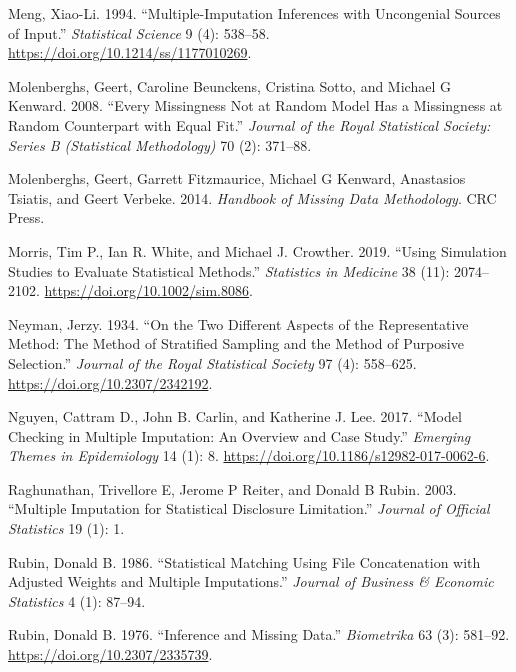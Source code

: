 \documentclass[
]{article}
\newlength{\cslhangindent}
\newlength{\cslentryspacingunit} %
\newenvironment{CSLReferences}[2] %
 {%
  \setlength{\parindent}{0pt}
  \ifodd #1
  \let\oldpar\par
  \def\par{\hangindent=\cslhangindent\oldpar}
  \fi
  \setlength{\parskip}{#2\cslentryspacingunit}
 }%
 {}
\begin{document}
\begin{CSLReferences}{1}{0}
\leavevmode{}%
Meng, Xiao-Li. 1994. {``Multiple-{Imputation Inferences} with
{Uncongenial Sources} of {Input}.''} \emph{Statistical Science} 9 (4):
538--58. \url{https://doi.org/10.1214/ss/1177010269}.

\leavevmode{}%
Molenberghs, Geert, Caroline Beunckens, Cristina Sotto, and Michael G
Kenward. 2008. {``Every Missingness Not at Random Model Has a
Missingness at Random Counterpart with Equal Fit.''} \emph{Journal of
the Royal Statistical Society: Series B (Statistical Methodology)} 70
(2): 371--88.

\leavevmode{}%
Molenberghs, Geert, Garrett Fitzmaurice, Michael G Kenward, Anastasios
Tsiatis, and Geert Verbeke. 2014. \emph{Handbook of Missing Data
Methodology}. {CRC Press}.

\leavevmode{}%
Morris, Tim P., Ian R. White, and Michael J. Crowther. 2019. {``Using
Simulation Studies to Evaluate Statistical Methods.''} \emph{Statistics
in Medicine} 38 (11): 2074--2102.
\url{https://doi.org/10.1002/sim.8086}.

\leavevmode{}%
Neyman, Jerzy. 1934. {``On the {Two Different Aspects} of the
{Representative Method}: {The Method} of {Stratified Sampling} and the
{Method} of {Purposive Selection}.''} \emph{Journal of the Royal
Statistical Society} 97 (4): 558--625.
\url{https://doi.org/10.2307/2342192}.

\leavevmode{}%
Nguyen, Cattram D., John B. Carlin, and Katherine J. Lee. 2017. {``Model
Checking in Multiple Imputation: An Overview and Case Study.''}
\emph{Emerging Themes in Epidemiology} 14 (1): 8.
\url{https://doi.org/10.1186/s12982-017-0062-6}.

\leavevmode{}%
Raghunathan, Trivellore E, Jerome P Reiter, and Donald B Rubin. 2003.
{``Multiple Imputation for Statistical Disclosure Limitation.''}
\emph{Journal of Official Statistics} 19 (1): 1.

\leavevmode{}%
Rubin, Donald B. 1986. {``Statistical Matching Using File Concatenation
with Adjusted Weights and Multiple Imputations.''} \emph{Journal of
Business \& Economic Statistics} 4 (1): 87--94.

\leavevmode{}%
Rubin, Donald B. 1976. {``Inference and {Missing Data}.''}
\emph{Biometrika} 63 (3): 581--92.
\url{https://doi.org/10.2307/2335739}.


\end{CSLReferences}
\end{document}
